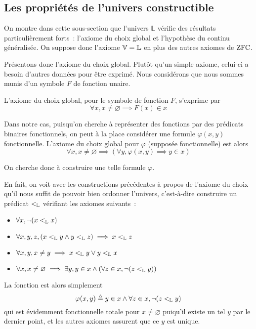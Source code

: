 \subsection{Les propriétés de l'univers constructible}

On montre dans cette sous-section que l'univers $\mathbb L$ vérifie des
résultats particulièrement forts~: l'axiome du choix global et l'hypothèse du
continu généralisée. On suppose donc l'axiome $\mathbb V = \mathbb L$ en plus des autres axiomes
de $\operatorname{ZFC}$.

Présentons donc l'axiome du choix global. Plutôt qu'un simple axiome, celui-ci
a besoin d'autres données pour être exprimé. Nous considérons que nous sommes
munis d'un symbole $F$ de fonction unaire.

\begin{axiom}
  L'axiome du choix global, pour le symbole de fonction $F$, s'exprime par
  \[\forall x, x\neq \varnothing \implies F(x)\in x\]
\end{axiom}

Dans notre cas, puisqu'on cherche à représenter des fonctions par des prédicats
binaires fonctionnels, on peut à la place considérer une formule $\varphi(x,y)$
fonctionnelle. L'axiome du choix global pour $\varphi$ (supposée fonctionnelle)
est alors
\[\forall x, x \neq \varnothing \implies (\forall y, \varphi(x,y)\implies
y\in x)\]

On cherche donc à construire une telle formule $\varphi$.

En fait, on voit avec les constructions précédentes à propos de l'axiome du
choix qu'il nous suffit de pouvoir bien ordonner l'univers, c'est-à-dire
construire un prédicat $<_{\mathbb L}$ vérifiant les axiomes suivants~:
\begin{itemize}
\item $\forall x, \lnot(x <_{\mathbb L} x)$
\item $\forall x,y,z, (x <_{\mathbb L} y \land y <_{\mathbb L} z) \implies x <_{\mathbb L} z$
\item $\forall x,y, x\neq y \implies x <_{\mathbb L} y \lor y <_{\mathbb L} x$
\item $\forall x, x\neq \varnothing \implies
  \exists y, y \in x \land (\forall z \in x, \lnot (z <_{\mathbb L} y))$
\end{itemize}
La fonction est alors simplement
\[\varphi(x,y) \triangleq y \in x \land \forall z \in x, \lnot(z <_{\mathbb L} y)\]
qui est évidemment fonctionnelle totale pour $x\neq \varnothing$ puiqu'il existe
un tel $y$ par le dernier point, et les autres axiomes assurent que ce $y$ est
unique.

